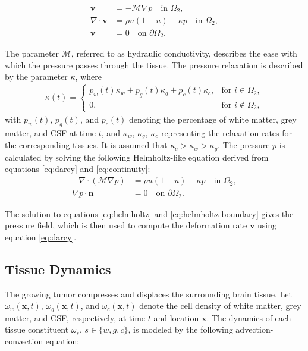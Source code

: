 \documentclass[12pt]{article}
\newcommand{\bn}{\mathbf{n}}
\newcommand{\bv}{\mathbf{v}}
\newcommand{\bx}{\mathbf{x}}
\newcommand{\calM}{\mathcal{M}}
\begin{document}
\begin{align}
    \bv &= -\calM \nabla p \quad \text{in } \Omega_2, \label{eq:darcy} \\
    \nabla \cdot \bv &= \rho u(1 - u) - \kappa p \quad \text{in } \Omega_2, \label{eq:continuity} \\
    \bv &= 0 \quad \text{on } \partial \Omega_2. \label{eq:boundary-conditions}
\end{align}

The parameter \( \calM \), referred to as hydraulic conductivity, describes the ease with which the pressure passes through the tissue. The pressure relaxation is described by the parameter \(\kappa\), where
\begin{align}
    \kappa(t) = 
    \begin{cases} 
      p_w(t) \kappa_w + p_g(t) \kappa_g + p_c(t) \kappa_c, & \text{for } i \in \Omega_2, \\
      0, & \text{for } i \notin \Omega_2,
    \end{cases}
\end{align}
with \( p_w(t) \), \( p_g(t) \), and \( p_c(t) \) denoting the percentage of white matter, grey matter, and CSF at time \( t \), and \(\kappa_w\), \(\kappa_g\), \(\kappa_c\) representing the relaxation rates for the corresponding tissues. It is assumed that \(\kappa_c > \kappa_w > \kappa_g\). The pressure \( p \) is calculated by solving the following Helmholtz-like equation derived from equations \eqref{eq:darcy} and \eqref{eq:continuity}:
\begin{align}
    -\nabla \cdot (\calM \nabla p) &= \rho u(1 - u) - \kappa p \quad \text{in } \Omega_2, \label{eq:helmholtz} \\
    \nabla p \cdot \bn &= 0 \quad \text{on } \partial \Omega_2. \label{eq:helmholtz-boundary}
\end{align}

The solution to equations \eqref{eq:helmholtz} and \eqref{eq:helmholtz-boundary} gives the pressure field, which is then used to compute the deformation rate \(\bv\) using equation \eqref{eq:darcy}.

\subsection{Tissue Dynamics}

The growing tumor compresses and displaces the surrounding brain tissue. Let \( \omega_w(\bx,t) \), \( \omega_g(\bx,t) \), and \( \omega_c(\bx,t) \) denote the cell density of white matter, grey matter, and CSF, respectively, at time \( t \) and location \( \bx \). The dynamics of each tissue constituent \( \omega_s\), \( s \in \{w, g, c\} \), is modeled by the following advection-convection equation:
\end{document}
